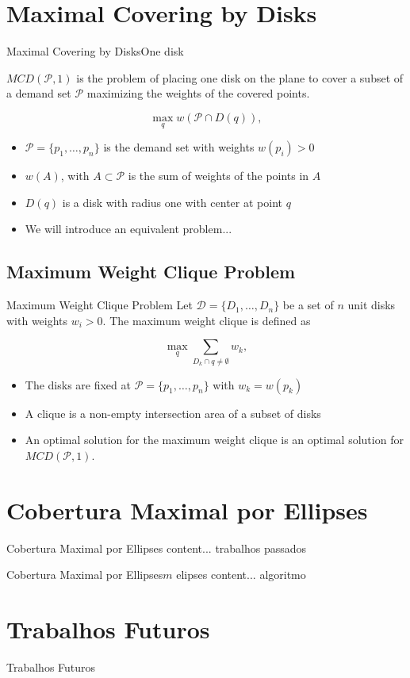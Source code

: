 \documentclass{beamer}
\newcommand{\D}{\mathscr{D}}
\newcommand{\Pp}{\mathscr{P}}
\begin{document}
\section{Maximal Covering by Disks}
\begin{frame}{Maximal Covering by Disks}{One disk}
	
	$MCD(\Pp, 1)$ is the problem of placing one disk on the plane to cover a subset of a demand set $\Pp$ maximizing the weights of the covered points.
	
	\begin{equation*}\label{eq:max_one_disk}
		\max_q w(\Pp \cap D(q)),
	\end{equation*}
	
	\begin{itemize}
		\item $\Pp=\{p_1,\dots,p_n\}$ is the demand set with weights $w(p_i)>0$
		\item $w(A)$, with $A\subset \Pp$ is the sum of weights of the points in $A$
		\item $D(q)$ is a disk with radius one with center at point $q$
		\item We will introduce an equivalent problem...
	\end{itemize}
\end{frame}

\subsection{Maximum Weight Clique Problem}
\begin{frame}{Maximum Weight Clique Problem}
	Let $\D=\{D_1,\dots,D_n\}$ be a set of $n$ unit disks with weights $w_i>0$. The maximum weight clique is defined as
	
	\begin{equation*}
	\max_q \sum_{D_k \cap q \neq \emptyset} w_k,
	\end{equation*}
	
	\begin{itemize}
		\item The disks are fixed at $\Pp =\{p_1,\dots,p_n\}$ with $w_k=w(p_k)$
		\item A clique is a non-empty intersection area of a subset of disks
		\item An optimal solution for the maximum weight clique is an optimal solution for $MCD(\Pp,1)$.
	\end{itemize}
\end{frame}


\section{Cobertura Maximal por Ellipses}

\begin{frame}{Cobertura Maximal por Ellipses}
	content... trabalhos passados
\end{frame}

\begin{frame}{Cobertura Maximal por Ellipses}{$m$ elipses}
	content... algoritmo
\end{frame}

\section{Trabalhos Futuros}

\begin{frame}{Trabalhos Futuros}

\end{frame}
\end{document}
